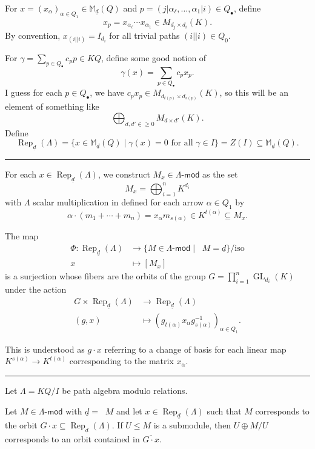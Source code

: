 \documentclass[12pt]{article}
\newcommand{\sepline}{\rule{\textwidth}{0.4pt}}
\theoremstyle{definition}
\newcommand{\M}{\mathbb{M}}
\newcommand{\<}{\langle}
\renewcommand{\>}{\rangle}
\newcommand{\clo}{\overline}
\newcommand{\seq}{\subseteq}
\newcommand{\dd}{{\underline{d}}}
\DeclareMathOperator{\Dim}{\underline{dim}}
\DeclareMathOperator{\Rep}{Rep}
\DeclareMathOperator{\GL}{GL}
\renewcommand{\mod}{\mathsf{\text{-}mod}}
\renewcommand{\_}[1]{{_{#1}}}
\begin{document}
For $x = (x_\alpha)_{\alpha \in Q_1} \in \M_\dd(Q)$ and $p = (j|\alpha_\ell, \dots, \alpha_1|i) \in Q_\bullet$, define
\[
    x_p = x_{\alpha_\ell} \cdots x_{\alpha_1} \in M_{d_j \times d_i}(K).
\]
By convention, $x_{(i||i)} = I_{d_i}$ for all trivial paths $(i||i) \in Q_0$.

For $\gamma = \sum_{p \in Q_\bullet} c_p p \in KQ$, define some good notion of
\[
    \gamma(x) = \sum_{p \in Q_\bullet} c_p x_p.
\]
I guess for each $p \in Q_\bullet$, we have $c_px_p \in M_{d_{t(p)} \times d_{s(p)}}(K)$, so this will be an element of something like
\[
    \bigoplus_{d, d' \in \geq 0} M_{d \times d'}(K).
\]
Define
\[
    \Rep_\dd(\Lambda)
        = \{x \in \M_\dd(Q) \mid \gamma(x) = 0 \text{ for all } \gamma \in I\}
        = Z(I) \seq \M_\dd(Q).
\] 

\sepline

For each $x \in \Rep_\dd(\Lambda)$, we construct $M_x \in \Lambda\mod$ as the set
\[
    M_x = \bigoplus_{i=1}^{n} K^{d_i}
\]
with $\Lambda$ scalar multiplication in defined for each arrow $\alpha \in Q_1$ by
\[
    \alpha \cdot (m_1 + \cdots + m_n) = x_\alpha m_{s(\alpha)} \in K^{t(\alpha)} \seq M_x.
\]


The map
\begin{align*}
    \Phi : \Rep_\dd(\Lambda) &\longrightarrow \{M \in \Lambda\mod \mid \Dim M = \dd\}/\text{iso} \\
        x &\longmapsto [M_x]
\end{align*}
is a surjection whose fibers are the orbits of the group $G = \prod_{i=1}^{n} \GL_{d_i} (K)$ under the action
\begin{align*}
    G \times \Rep_\dd(\Lambda) &\longrightarrow \Rep_\dd(\Lambda) \\
        (g, x) &\longmapsto \left(g_{t(\alpha)} x_\alpha g_{s(\alpha)}^{-1}\right)_{\alpha \in Q_1}.
\end{align*}

This is understood as $g \cdot x$ referring to a change of basis for each linear map $K^{s(\alpha)} \to K^{t(\alpha)}$ corresponding to the matrix $x_\alpha$.

\sepline

Let $\Lambda = KQ/I$ be path algebra modulo relations.

Let $M \in \Lambda\mod$ with $\dd = \Dim M$ and let $x \in \Rep_\dd(\Lambda)$ such that $M$ corresponds to the orbit $G \cdot x \seq \Rep_\dd(\Lambda)$.
If $U \leq M$ is a submodule, then $U \oplus M/U$ corresponds to an orbit contained in $\clo{G \cdot x}$.
\end{document}
